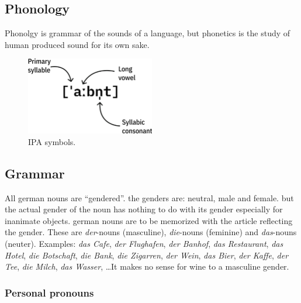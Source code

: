 \documentclass[a4paper]{article}
\begin{document}
\subsection*{Phonology}
Phonolgy is grammar of the sounds of a language, but phonetics is the study of human produced sound for its own sake.

\begin{figure}[hbt]
    \begin{center}
        \includegraphics[width=0.5\textwidth]{graphics/ipa.png}
        \caption{IPA symbols.}
    \end{center}
\end{figure}

\subsection*{Grammar}
All german nouns are ``gendered''. the genders are: neutral, male and female. but the actual gender of the noun has
nothing to do with its gender especially for inanimate objects. german nouns are to be memorized with the 
article reflecting the gender. These are \emph{der}-nouns (masculine), \emph{die}-nouns (feminine) and \emph{das}-nouns 
(neuter). Examples: \emph{das Cafe}, \emph{der Flughafen}, \emph{der Banhof}, \emph{das Restaurant}, \emph{das Hotel},
\emph{die Botschaft}, \emph{die Bank}, \emph{die Zigarren}, \emph{der Wein}, \emph{das Bier}, \emph{der Kaffe},
\emph{der Tee}, \emph{die Milch}, \emph{das Wasser}, \ldots It makes no sense for wine to a masculine gender.

\subsubsection*{Personal pronouns}
\end{document}
